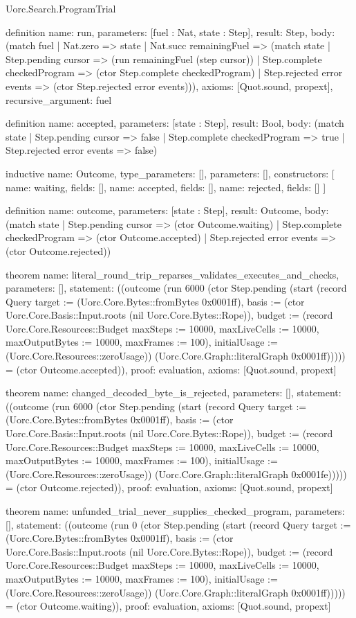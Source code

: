 \begin{lexlean}{Uorc.Search.ProgramTrial}
\begin{semanticmodule}
definition{
  name: run,
  parameters: [fuel : Nat, state : Step],
  result: Step,
  body: (match fuel
    | Nat.zero => state
    | Nat.succ remainingFuel => (match state
      | Step.pending cursor => (run remainingFuel (step cursor))
      | Step.complete checkedProgram => (ctor Step.complete checkedProgram)
      | Step.rejected error events => (ctor Step.rejected error events))),
  axioms: [Quot.sound, propext],
  recursive_argument: fuel
}

definition{
  name: accepted,
  parameters: [state : Step],
  result: Bool,
  body: (match state
    | Step.pending cursor => false
    | Step.complete checkedProgram => true
    | Step.rejected error events => false)
}

inductive{
  name: Outcome,
  type_parameters: [],
  parameters: [],
  constructors: [
    {name: waiting, fields: []},
    {name: accepted, fields: []},
    {name: rejected, fields: []}
  ]
}

definition{
  name: outcome,
  parameters: [state : Step],
  result: Outcome,
  body: (match state
    | Step.pending cursor => (ctor Outcome.waiting)
    | Step.complete checkedProgram => (ctor Outcome.accepted)
    | Step.rejected error events => (ctor Outcome.rejected))
}

theorem{
  name: literal_round_trip_reparses_validates_executes_and_checks,
  parameters: [],
  statement: ((outcome (run 6000 (ctor Step.pending (start (record Query {target := (Uorc.Core.Bytes::fromBytes 0x0001ff), basis := (ctor Uorc.Core.Basis::Input.roots (nil Uorc.Core.Bytes::Rope)), budget := (record Uorc.Core.Resources::Budget {maxSteps := 10000, maxLiveCells := 10000, maxOutputBytes := 10000, maxFrames := 100}), initialUsage := (Uorc.Core.Resources::zeroUsage)}) (Uorc.Core.Graph::literalGraph 0x0001ff))))) = (ctor Outcome.accepted)),
  proof: evaluation{},
  axioms: [Quot.sound, propext]
}

theorem{
  name: changed_decoded_byte_is_rejected,
  parameters: [],
  statement: ((outcome (run 6000 (ctor Step.pending (start (record Query {target := (Uorc.Core.Bytes::fromBytes 0x0001ff), basis := (ctor Uorc.Core.Basis::Input.roots (nil Uorc.Core.Bytes::Rope)), budget := (record Uorc.Core.Resources::Budget {maxSteps := 10000, maxLiveCells := 10000, maxOutputBytes := 10000, maxFrames := 100}), initialUsage := (Uorc.Core.Resources::zeroUsage)}) (Uorc.Core.Graph::literalGraph 0x0001fe))))) = (ctor Outcome.rejected)),
  proof: evaluation{},
  axioms: [Quot.sound, propext]
}

theorem{
  name: unfunded_trial_never_supplies_checked_program,
  parameters: [],
  statement: ((outcome (run 0 (ctor Step.pending (start (record Query {target := (Uorc.Core.Bytes::fromBytes 0x0001ff), basis := (ctor Uorc.Core.Basis::Input.roots (nil Uorc.Core.Bytes::Rope)), budget := (record Uorc.Core.Resources::Budget {maxSteps := 10000, maxLiveCells := 10000, maxOutputBytes := 10000, maxFrames := 100}), initialUsage := (Uorc.Core.Resources::zeroUsage)}) (Uorc.Core.Graph::literalGraph 0x0001ff))))) = (ctor Outcome.waiting)),
  proof: evaluation{},
  axioms: [Quot.sound, propext]
}


\end{semanticmodule}
\end{lexlean}
